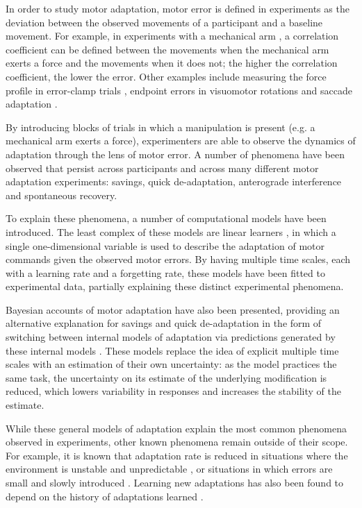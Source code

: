 \documentclass[a4paper,doc,floatsintext,natbib]{apa6}
\begin{document}
In order to study motor adaptation, motor error is defined in experiments as the deviation between the observed movements of a participant and a baseline movement. For example, in experiments with a mechanical arm \citep[e.g.][]{Gandolfo_Motor_1996}, a correlation coefficient can be defined between the movements when the mechanical arm exerts a force and the movements when it does not; the higher the correlation coefficient, the lower the error. Other examples include measuring the force profile in error-clamp trials \citep{Smith_Interacting_2006}, endpoint errors in visuomotor rotations \citep{Kim_Neural_2015} and saccade adaptation \citep{Catz_Cerebellardependent_2008}.

By introducing blocks of trials in which a manipulation is present (e.g. a mechanical arm exerts a force), experimenters are able to observe the dynamics of adaptation through the lens of motor error. A number of phenomena have been observed that persist across participants and across many different motor adaptation experiments: savings, quick de-adaptation, anterograde interference and spontaneous recovery.

To explain these phenomena, a number of computational models have been introduced. The least complex of these models are linear learners \citep[e.g.][]{Smith_Interacting_2006,Forano_Timescales_2020,Scheidt_Learning_2001}, in which a single one-dimensional variable is used to describe the adaptation of motor commands given the observed motor errors. By having multiple time scales, each with a learning rate and a forgetting rate, these models have been fitted to experimental data, partially explaining these distinct experimental phenomena.

Bayesian accounts of motor adaptation have also been presented, providing an alternative explanation for savings and quick de-adaptation in the form of switching between internal models of adaptation via predictions generated by these internal models \citep{Kording_Bayesian_2004,Oh_Minimizing_2019}. These models replace the idea of explicit multiple time scales with an estimation of their own uncertainty: as the model practices the same task, the uncertainty on its estimate of the underlying modification is reduced, which lowers variability in responses and increases the stability of the estimate.

While these general models of adaptation explain the most common phenomena observed in experiments, other known phenomena remain outside of their scope. For example, it is known that adaptation rate is reduced in situations where the environment is unstable and unpredictable \citep{Herzfeld_memory_2014}, or situations in which errors are small \citep{Marko_Sensitivity_2012} and slowly introduced \citep{Huang_Persistence_2009}. Learning new adaptations has also been found to depend on the history of adaptations learned \citep{Vaswani_Decay_2013}.
\end{document}
